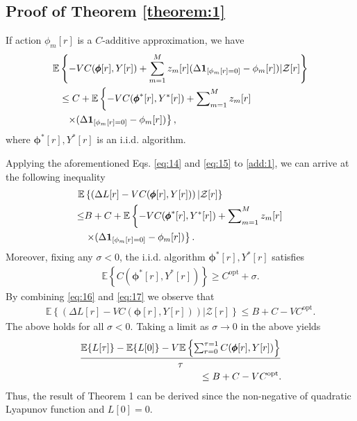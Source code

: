 \documentclass[journal]{IEEEtran}
\begin{document}
\begin{appendices}
\section{Proof of Theorem \ref{theorem:1}}
If action $\phi_m[r]$ is a $C\text{-additive}$ approximation, we have
\begin{align}\label{add:1}
    \mathbb{E}&\left\{-VC(\pmb\phi[r],Y[r])+\sum_{m=1}^Mz_m[r](\Delta {\boldsymbol 1}_{[\phi_m[r]=0]}-\phi_m[r])|\mathcal{Z}[r]\right\} \notag \\
    &\le C+\mathbb{E}\left \{ -VC({\pmb\phi}^{*}[r],Y^*[r])+
    \sum\nolimits_{m=1}^Mz_m[r]\right.\notag \\
    &\left.~~\times(\Delta{\boldsymbol 1}_{[\phi_m[r]=0]} -\phi_m[r])\right\},
\end{align}
where ${\pmb\phi}^*[r],Y^*[r]$ is an i.i.d. algorithm.

Applying the aforementioned Eqs. \eqref{eq:14} and \eqref{eq:15} to \eqref{add:1}, we can arrive at the following inequality
\begin{align}\label{eq:16}
    \mathbb{E}&\left\{ \left ( \Delta L[r]-VC({\pmb\phi}[r],Y[r])\right )|\mathcal{Z}[r]\right\}\notag \\
    \le& B+C+\mathbb{E}\left \{ -VC({\pmb\phi}^*[r],Y^*[r])
    +\sum\nolimits_{m=1}^Mz_m[r]\right.\notag \\
    &\left.\times(\Delta {\boldsymbol 1}_{[\phi_m[r]=0]}-\phi_m[r]) \right\}.
\end{align}\label{eq:17}
Moreover, fixing any $\sigma<0$, the i.i.d. algorithm ${\pmb\phi}^*[r],Y^*[r]$ satisfies
\begin{align}\label{eq:17}
    \mathbb{E}\left\{ C({\pmb\phi}^*[r],Y^*[r])\right \} \ge C^{\text{opt}} + \sigma.
\end{align}
By combining \eqref{eq:16} and \eqref{eq:17} we observe that
\begin{align}\label{eq:18}
    \mathbb{E}\left\{ \left(\Delta L[r]-VC({\pmb\phi}[r],Y[r]) \right)|\mathcal{Z}[r]\right\} \le
    B+C-VC^{\text{opt}}.
\end{align}
The above holds for all $\sigma <0$. Taking a limit as $\sigma \to 0$ in the above yields
\begin{align}
    \frac{\mathbb{E}\{L[\tau]\}-\mathbb{E}\{L[0]\}-V\mathbb{E}\left\{\sum_{r=0}^{\tau=1}C({\pmb\phi}[r],Y[r])\right\}}{\tau} \notag \\
    \le B+C-VC^{\text{opt}}.
\end{align}
Thus, the result of Theorem 1 can be derived since the non-negative of quadratic Lyapunov function and $L[0]=0$.

\end{appendices}
\end{document}
